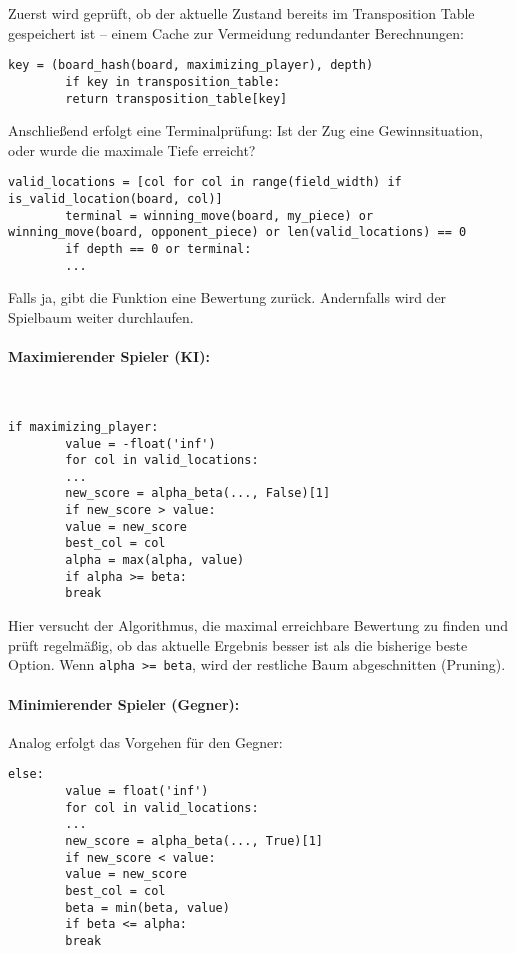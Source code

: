 	Zuerst wird geprüft, ob der aktuelle Zustand bereits im Transposition Table gespeichert ist – einem Cache zur Vermeidung redundanter Berechnungen:
	
	\begin{lstlisting}[style=pythonstyle]
		key = (board_hash(board, maximizing_player), depth)
		if key in transposition_table:
		return transposition_table[key]
	\end{lstlisting}
	
	Anschließend erfolgt eine Terminalprüfung: Ist der Zug eine Gewinnsituation, oder wurde die maximale Tiefe erreicht?
	
	\begin{lstlisting}[style=pythonstyle]
		valid_locations = [col for col in range(field_width) if is_valid_location(board, col)]
		terminal = winning_move(board, my_piece) or winning_move(board, opponent_piece) or len(valid_locations) == 0
		if depth == 0 or terminal:
		...
	\end{lstlisting}
	
	Falls ja, gibt die Funktion eine Bewertung zurück. Andernfalls wird der Spielbaum weiter durchlaufen.
	
	\paragraph*{Maximierender Spieler (KI):}
	\\
	
	\begin{lstlisting}[style=pythonstyle]
		if maximizing_player:
		value = -float('inf')
		for col in valid_locations:
		...
		new_score = alpha_beta(..., False)[1]
		if new_score > value:
		value = new_score
		best_col = col
		alpha = max(alpha, value)
		if alpha >= beta:
		break
	\end{lstlisting}
	
	Hier versucht der Algorithmus, die maximal erreichbare Bewertung zu finden und prüft regelmäßig, ob das aktuelle Ergebnis besser ist als die bisherige beste Option. Wenn \texttt{alpha >= beta}, wird der restliche Baum abgeschnitten (Pruning).
	
	\paragraph*{Minimierender Spieler (Gegner):}
	
	Analog erfolgt das Vorgehen für den Gegner:
	
	\begin{lstlisting}[style=pythonstyle]
		else:
		value = float('inf')
		for col in valid_locations:
		...
		new_score = alpha_beta(..., True)[1]
		if new_score < value:
		value = new_score
		best_col = col
		beta = min(beta, value)
		if beta <= alpha:
		break
	\end{lstlisting}
	
